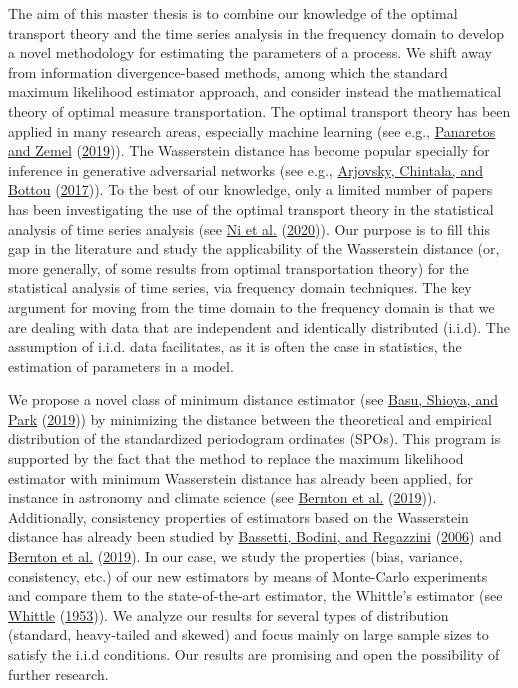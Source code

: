 \documentclass[
  11pt,
]{article}
\begin{document}
The aim of this master thesis is to combine our knowledge of the optimal
transport theory and the time series analysis in the frequency domain to
develop a novel methodology for estimating the parameters of a process.
We shift away from information divergence-based methods, among which the
standard maximum likelihood estimator approach, and consider instead the
mathematical theory of optimal measure transportation. The optimal
transport theory has been applied in many research areas, especially
machine learning (see e.g.,
\protect\hyperlink{ref-panaretos2019statistical}{Panaretos and Zemel}
(\protect\hyperlink{ref-panaretos2019statistical}{2019})). The
Wasserstein distance has become popular specially for inference in
generative adversarial networks (see e.g.,
\protect\hyperlink{ref-arjovsky2017wasserstein}{Arjovsky, Chintala, and
Bottou} (\protect\hyperlink{ref-arjovsky2017wasserstein}{2017})). To the
best of our knowledge, only a limited number of papers has been
investigating the use of the optimal transport theory in the statistical
analysis of time series analysis (see
\protect\hyperlink{ref-ni2020conditional}{Ni et al.}
(\protect\hyperlink{ref-ni2020conditional}{2020})). Our purpose is to
fill this gap in the literature and study the applicability of the
Wasserstein distance (or, more generally, of some results from optimal
transportation theory) for the statistical analysis of time series, via
frequency domain techniques. The key argument for moving from the time
domain to the frequency domain is that we are dealing with data that are
independent and identically distributed (i.i.d). The assumption of
i.i.d. data facilitates, as it is often the case in statistics, the
estimation of parameters in a model.

We propose a novel class of minimum distance estimator (see
\protect\hyperlink{ref-basu2019statistical}{Basu, Shioya, and Park}
(\protect\hyperlink{ref-basu2019statistical}{2019})) by minimizing the
distance between the theoretical and empirical distribution of the
standardized periodogram ordinates (SPOs). This program is supported by
the fact that the method to replace the maximum likelihood estimator
with minimum Wasserstein distance has already been applied, for instance
in astronomy and climate science (see
\protect\hyperlink{ref-bernton2019parameter}{Bernton et al.}
(\protect\hyperlink{ref-bernton2019parameter}{2019})). Additionally,
consistency properties of estimators based on the Wasserstein distance
has already been studied by
\protect\hyperlink{ref-bassetti2006minimum}{Bassetti, Bodini, and
Regazzini} (\protect\hyperlink{ref-bassetti2006minimum}{2006}) and
\protect\hyperlink{ref-bernton2019parameter}{Bernton et al.}
(\protect\hyperlink{ref-bernton2019parameter}{2019}). In our case, we
study the properties (bias, variance, consistency, etc.) of our new
estimators by means of Monte-Carlo experiments and compare them to the
state-of-the-art estimator, the Whittle's estimator (see
\protect\hyperlink{ref-whittle1953estimation}{Whittle}
(\protect\hyperlink{ref-whittle1953estimation}{1953})). We analyze our
results for several types of distribution (standard, heavy-tailed and
skewed) and focus mainly on large sample sizes to satisfy the i.i.d
conditions. Our results are promising and open the possibility of
further research.
\end{document}
